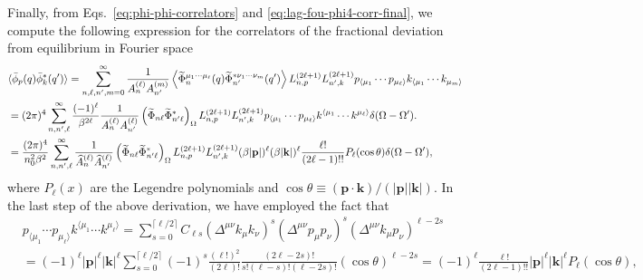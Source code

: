 \documentclass[aps,prd,preprint,nofootinbib,amsmath,amssymb,showpacs,longbibliography,singlecolumn,superscriptaddress,10pt]{revtex4-1}
\theoremstyle{plain}
\theoremstyle{definition}
\begin{document}
Finally, from Eqs.~\eqref{eq:phi-phi-correlators} and \eqref{eq:lag-fou-phi4-corr-final}, we compute the following expression for the correlators of the fractional deviation from equilibrium in Fourier space
%
\begin{equation}
\label{eq:phi-phi-correlators-apn}
\begin{aligned}
&
\langle \Bar{\phi}_{p}(q) \Bar{\phi}^{*}_{k}(q')  \rangle 
=
\sum_{n,\ell, n',m = 0}^{\infty} \frac{1}{A_{n}^{(\ell)} A_{n'}^{(m)} } 
\left\langle \widetilde{\Phi}_{n}^{\mu_{1} \cdots \mu_{\ell}}(q) \widetilde{\Phi}_{n'}^{*\nu_{1} \cdots \nu_{m}}(q') \right\rangle
L^{(2 \ell + 1)}_{n, p}
L^{(2 \ell + 1)}_{n', k}
 p_{\langle \mu_{1}} \cdots p_{ \mu_{\ell}
 \rangle}
  k_{\langle \mu_{1}} \cdots k_{ \mu_{m}
 \rangle}
\\
&
=
(2 \pi)^{4}
\sum_{n,n',\ell}^{\infty} \frac{(-1)^{\ell}}{\beta^{2\ell}} \frac{1}{A_{n}^{(\ell)} A_{n'}^{(\ell)} } 
\left( \widetilde{\Phi}_{n\ell}
\widetilde{\Phi}_{n' \ell}^{*}
 \right)_{\Omega}   L^{(2 \ell + 1)}_{n, p}
L^{(2 \ell + 1)}_{n', k}
 p_{\langle \mu_{1}} \cdots p_{ \mu_{\ell}
 \rangle}
  k^{\langle \mu_{1}} \cdots k^{ \mu_{\ell}
 \rangle}
 \delta(\Omega - \Omega').
\\
&
=
\frac{(2 \pi)^{4}}
{n_{0}^{2}\beta^{2}}
\sum_{n,n',\ell}^{\infty}  \frac{1}{\widehat{A}_{n}^{(\ell)} \widehat{A}_{n'}^{(\ell)} } 
\left( \widetilde{\Phi}_{n\ell}
\widetilde{\Phi}_{n' \ell}^{*}
 \right)_{\Omega}   L^{(2 \ell + 1)}_{n, p}
L^{(2 \ell + 1)}_{n', k}
 (\beta \vert \mathbf{p} \vert)^{\ell}
 (\beta \vert \mathbf{k} \vert)^{\ell} 
 \frac{\ell!}{(2\ell -1)!!}
P_{\ell}(\cos \theta)
 \delta(\Omega - \Omega'),
\end{aligned}    
\end{equation}
%
where $P_{\ell}(x)$ are the Legendre polynomials and $\cos \theta \equiv (\mathbf{p} \cdot \mathbf{k})/(\vert \mathbf{p} \vert \vert \mathbf{k} \vert)$. In the last step of the above derivation, we have employed the fact that 
%
\begin{equation}
\begin{aligned}
&
p_{\langle \mu_{1}} \cdots p_{\mu_{\ell} \rangle}
k^{\langle \mu_{1}} \cdots k^{\mu_{\ell} \rangle} 
= 
\sum_{s=0}^{\lceil \ell / 2 \rceil} C_{\ell s} \left(\Delta^{\mu \nu} k_{\mu} k_{\nu}\right)^{s} \left(\Delta^{\mu \nu} p_{\mu} p_{\nu}\right)^{s} 
\left(\Delta^{\mu \nu} k_{\mu} p_{\nu}\right)^{\ell - 2s}
\\
&
= 
(-1)^{\ell}
\vert \mathbf{p} \vert^{\ell} \vert \mathbf{k} \vert^{\ell}
\sum_{s=0}^{\lceil \ell / 2 \rceil}(-1)^{s} \frac{(\ell!)^{2}}{(2 \ell)!} \frac{(2 \ell - 2s)!}{s!(\ell-s)!(\ell-2s)!} \left(\cos \theta\right)^{\ell - 2s}
=
(-1)^{\ell}\frac{\ell!}{(2\ell -1)!!}
\vert \mathbf{p} \vert^{\ell} \vert \mathbf{k} \vert^{\ell} P_{\ell}(\cos \theta)
,
\end{aligned}    
\end{equation}
\end{document}
